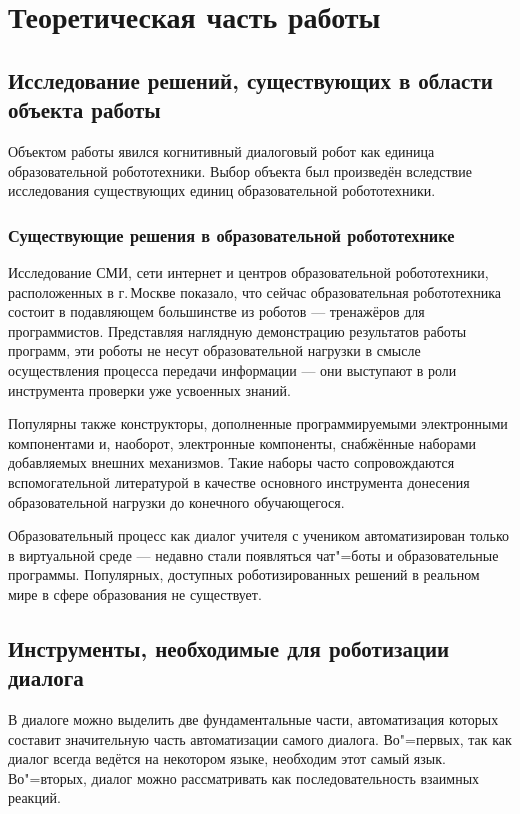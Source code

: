 \chapter{Теоретическая часть работы}

\section{Исследование решений, существующих в области объекта работы}

Объектом работы явился когнитивный диалоговый робот как единица образовательной робототехники. Выбор объекта был произведён вследствие исследования существующих единиц образовательной робототехники.

\subsection{Существующие решения в образовательной робототехнике}

Исследование СМИ, сети интернет и центров образовательной робототехники, расположенных в г.\,Москве показало, что сейчас образовательная робототехника состоит в подавляющем большинстве из роботов --- тренажёров для программистов. Представляя наглядную демонстрацию результатов работы программ, эти роботы не несут образовательной нагрузки в смысле осуществления процесса передачи информации --- они выступают в роли инструмента проверки уже усвоенных знаний. 

Популярны также конструкторы, дополненные программируемыми электронными компонентами и, наоборот, электронные компоненты, снабжённые наборами добавляемых внешних механизмов. Такие наборы часто сопровождаются вспомогательной литературой в качестве основного инструмента донесения образовательной нагрузки до конечного обучающегося.

Образовательный процесс как диалог учителя с учеником автоматизирован только в виртуальной среде --- недавно стали появляться чат"=боты и образовательные программы. Популярных, доступных роботизированных решений в реальном мире в сфере образования не существует.

\section{Инструменты, необходимые для роботизации диалога}\label{dialogue-instruments}
В диалоге можно выделить две фундаментальные части, автоматизация которых составит значительную часть автоматизации самого диалога. Во"=первых, так как диалог всегда ведётся на некотором языке, необходим этот самый язык. Во"=вторых, диалог можно рассматривать как последовательность взаимных реакций.

